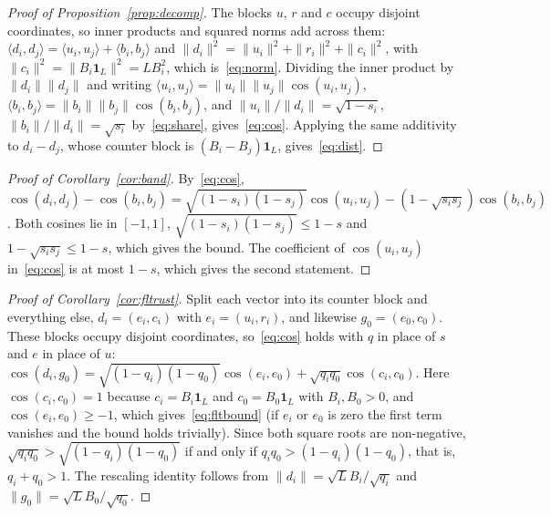 \documentclass[journal]{IEEEtran}
\begin{document}
\begin{proof}[Proof of Proposition~\ref{prop:decomp}]
The blocks $u$, $r$ and $c$ occupy disjoint coordinates, so inner products and
squared norms add across them: $\langle d_i,d_j\rangle=\langle u_i,u_j\rangle
+\langle b_i,b_j\rangle$ and $\|d_i\|^2=\|u_i\|^2+\|r_i\|^2+\|c_i\|^2$, with
$\|c_i\|^2=\|B_i\mathbf{1}_L\|^2=LB_i^2$, which is~\eqref{eq:norm}. Dividing the
inner product by $\|d_i\|\|d_j\|$ and writing
$\langle u_i,u_j\rangle=\|u_i\|\|u_j\|\cos(u_i,u_j)$,
$\langle b_i,b_j\rangle=\|b_i\|\|b_j\|\cos(b_i,b_j)$, and
$\|u_i\|/\|d_i\|=\sqrt{1-s_i}$, $\|b_i\|/\|d_i\|=\sqrt{s_i}$ by~\eqref{eq:share},
gives~\eqref{eq:cos}. Applying the same additivity to $d_i-d_j$, whose counter
block is $(B_i-B_j)\mathbf{1}_L$, gives~\eqref{eq:dist}.
\end{proof}


\begin{proof}[Proof of Corollary~\ref{cor:band}]
By~\eqref{eq:cos}, $\cos(d_i,d_j)-\cos(b_i,b_j)=\sqrt{(1-s_i)(1-s_j)}\cos(u_i,u_j)
-(1-\sqrt{s_is_j})\cos(b_i,b_j)$. Both cosines lie in $[-1,1]$,
$\sqrt{(1-s_i)(1-s_j)}\le 1-s$ and $1-\sqrt{s_is_j}\le 1-s$, which gives the
bound. The coefficient of $\cos(u_i,u_j)$ in~\eqref{eq:cos} is at most $1-s$,
which gives the second statement.
\end{proof}


\begin{proof}[Proof of Corollary~\ref{cor:fltrust}]
Split each vector into its counter block and everything else, $d_i=(e_i,c_i)$ with
$e_i=(u_i,r_i)$, and likewise $g_0=(e_0,c_0)$. These blocks occupy disjoint
coordinates, so~\eqref{eq:cos} holds with $q$ in place of $s$ and $e$ in place of
$u$: $\cos(d_i,g_0)=\sqrt{(1-q_i)(1-q_0)}\cos(e_i,e_0)+\sqrt{q_iq_0}\cos(c_i,c_0)$.
Here $\cos(c_i,c_0)=1$ because $c_i=B_i\mathbf{1}_L$ and $c_0=B_0\mathbf{1}_L$ with
$B_i,B_0>0$, and $\cos(e_i,e_0)\ge-1$, which gives~\eqref{eq:fltbound} (if $e_i$
or $e_0$ is zero the first term vanishes and the bound holds trivially). Since both
square roots are non-negative, $\sqrt{q_iq_0}>\sqrt{(1-q_i)(1-q_0)}$ if and only if
$q_iq_0>(1-q_i)(1-q_0)$, that is, $q_i+q_0>1$. The rescaling identity follows from
$\|d_i\|=\sqrt{L}B_i/\sqrt{q_i}$ and $\|g_0\|=\sqrt{L}B_0/\sqrt{q_0}$.
\end{proof}
\end{document}
